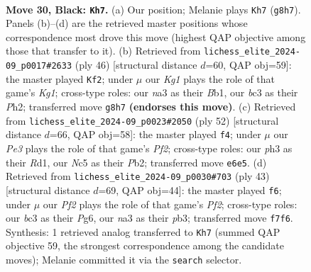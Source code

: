 \documentclass[11pt]{article}
\begin{document}
\clearpage

\begin{figure}[p]\centering
\begin{subfigure}{0.46\textwidth}\centering
\resizebox{\linewidth}{!}{%
\newchessgame
\chessboard[
  setfen={1r3rk1/p4p2/bpB1p1pp/2n5/2P5/N1B1P2P/PR2KPP1/3R4 b - - 6 30},
  showmover=false,
  pgfstyle=straightmove, color=movearrow, markmove={g8-h7}
]}
\caption{}
\end{subfigure}\hfill
\begin{subfigure}{0.46\textwidth}\centering
\resizebox{\linewidth}{!}{%
\newchessgame
\chessboard[
  setfen={5rk1/p2r2pp/1pn5/1Np2b2/P1P5/3P1P2/6PP/RB3RK1 w - - 0 24},
  showmover=false,
  pgfstyle=straightmove, color=movearrow, markmove={g1-f2}
]}
\caption{}
\end{subfigure}
\\[4pt]
\begin{subfigure}{0.46\textwidth}\centering
\resizebox{\linewidth}{!}{%
\newchessgame
\chessboard[
  setfen={3rr1k1/pp3pb1/6pp/n3P3/P1p5/2Pp2BP/1P1N1PP1/3RR1K1 w - - 2 27},
  showmover=false,
  pgfstyle=straightmove, color=movearrow, markmove={f2-f4}
]}
\caption{}
\end{subfigure}\hfill
\begin{subfigure}{0.46\textwidth}\centering
\resizebox{\linewidth}{!}{%
\newchessgame
\chessboard[
  setfen={3r1rk1/p4p1p/3p2p1/2p1n3/8/1P2B1P1/P3PPKP/R2R4 b - - 0 22},
  showmover=false,
  pgfstyle=straightmove, color=movearrow, markmove={f7-f6}
]}
\caption{}
\end{subfigure}
\caption{\textbf{Move 30, Black: \texttt{Kh7}.} (a) Our position; Melanie plays \texttt{Kh7} (\texttt{g8h7}). Panels (b)--(d) are the retrieved master positions whose correspondence most drove this move (highest QAP objective among those that transfer to it). (b) Retrieved from \texttt{lichess\_elite\_2024-09\_p0017\#2633} (ply 46) [structural distance $d$=60, QAP obj=59]: the master played \texttt{Kf2}; under $\mu$ our \emph{Kg1} plays the role of that game's \emph{Kg1}; cross-type roles: our \emph{n}a3 as their \emph{B}b1, our \emph{b}c3 as their \emph{P}h2; transferred move \texttt{g8h7} \textbf{(endorses this move)}. (c) Retrieved from \texttt{lichess\_elite\_2024-09\_p0023\#2050} (ply 52) [structural distance $d$=66, QAP obj=58]: the master played \texttt{f4}; under $\mu$ our \emph{Pe3} plays the role of that game's \emph{Pf2}; cross-type roles: our \emph{p}h3 as their \emph{R}d1, our \emph{N}c5 as their \emph{P}b2; transferred move \texttt{e6e5}. (d) Retrieved from \texttt{lichess\_elite\_2024-09\_p0030\#703} (ply 43) [structural distance $d$=69, QAP obj=44]: the master played \texttt{f6}; under $\mu$ our \emph{Pf2} plays the role of that game's \emph{Pf2}; cross-type roles: our \emph{b}c3 as their \emph{P}g6, our \emph{n}a3 as their \emph{p}b3; transferred move \texttt{f7f6}. Synthesis: 1 retrieved analog transferred to \texttt{Kh7} (summed QAP objective 59, the strongest correspondence among the candidate moves); Melanie committed it via the \texttt{search} selector.}
\label{fig:thought-m59}
\end{figure}
\end{document}
